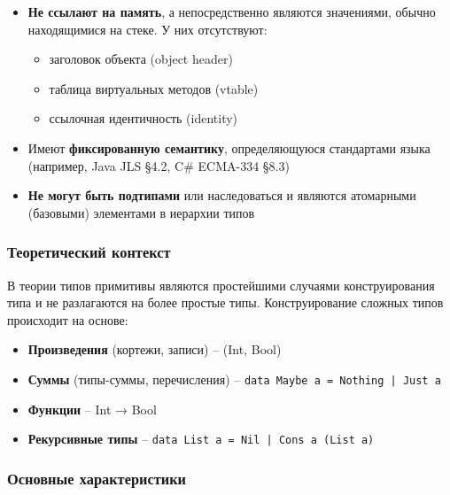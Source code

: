 \begin{itemize}
    \item \textbf{Не ссылают на память}, а непосредственно являются значениями, обычно находящимися на стеке. У них отсутствуют:
    \begin{itemize}
        \item заголовок объекта (object header)
        \item таблица виртуальных методов (vtable)
        \item ссылочная идентичность (identity)
    \end{itemize}

    \item Имеют \textbf{фиксированную семантику}, определяющуюся стандартами языка (например, Java JLS §4.2, C\# ECMA-334 §8.3)

    \item \textbf{Не могут быть подтипами} или наследоваться и являются атомарными (базовыми) элементами в иерархии типов
\end{itemize}

\subsubsection{Теоретический контекст}
В теории типов примитивы являются простейшими случаями конструирования типа и не разлагаются на более простые типы. Конструирование сложных типов происходит на основе:

\begin{itemize}
    \item \textbf{Произведения} (кортежи, записи) -- (Int, Bool)
    \item \textbf{Суммы} (типы-суммы, перечисления) -- \texttt{data Maybe a = Nothing | Just a}
    \item \textbf{Функции} -- Int → Bool
    \item \textbf{Рекурсивные типы} -- \texttt{data List a = Nil | Cons a (List a)}
\end{itemize}

\subsubsection{Основные характеристики}

